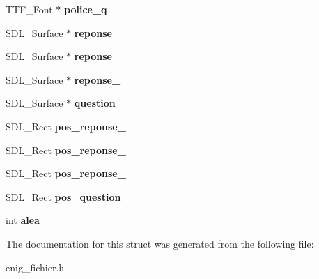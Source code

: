 \begin{DoxyCompactItemize}
\item 
T\+T\+F\+\_\+\+Font $\ast$ {\bfseries police\+\_\+q}\hypertarget{structenig__fichier_a02d52711f8a2ac96e3a5f943017a2ad4}{}\label{structenig__fichier_a02d52711f8a2ac96e3a5f943017a2ad4}

\item 
S\+D\+L\+\_\+\+Surface $\ast$ {\bfseries reponse\+\_}\hypertarget{structenig__fichier_a175bfff5134b24a3020d0dcd3f092a56}{}\label{structenig__fichier_a175bfff5134b24a3020d0dcd3f092a56}

\item 
S\+D\+L\+\_\+\+Surface $\ast$ {\bfseries reponse\+\_}\hypertarget{structenig__fichier_ad0a6c45ff0bdd032f0c300acd917ca25}{}\label{structenig__fichier_ad0a6c45ff0bdd032f0c300acd917ca25}

\item 
S\+D\+L\+\_\+\+Surface $\ast$ {\bfseries reponse\+\_}\hypertarget{structenig__fichier_afa09f852f3e2900e3b707341d82a221c}{}\label{structenig__fichier_afa09f852f3e2900e3b707341d82a221c}

\item 
S\+D\+L\+\_\+\+Surface $\ast$ {\bfseries question}\hypertarget{structenig__fichier_a4a5b9cc060528d5b8e91aab4bfe0c045}{}\label{structenig__fichier_a4a5b9cc060528d5b8e91aab4bfe0c045}

\item 
S\+D\+L\+\_\+\+Rect {\bfseries pos\+\_\+reponse\+\_}\hypertarget{structenig__fichier_a120aa667d779f2798aeabb95fb806a9c}{}\label{structenig__fichier_a120aa667d779f2798aeabb95fb806a9c}

\item 
S\+D\+L\+\_\+\+Rect {\bfseries pos\+\_\+reponse\+\_}\hypertarget{structenig__fichier_a6a6cda0d60b792872ae38af2e89d76c9}{}\label{structenig__fichier_a6a6cda0d60b792872ae38af2e89d76c9}

\item 
S\+D\+L\+\_\+\+Rect {\bfseries pos\+\_\+reponse\+\_}\hypertarget{structenig__fichier_a5efb104050d02226d82566373e92b50e}{}\label{structenig__fichier_a5efb104050d02226d82566373e92b50e}

\item 
S\+D\+L\+\_\+\+Rect {\bfseries pos\+\_\+question}\hypertarget{structenig__fichier_a119b85b096d29f8e4f684f1ac9272e47}{}\label{structenig__fichier_a119b85b096d29f8e4f684f1ac9272e47}

\item 
int {\bfseries alea}\hypertarget{structenig__fichier_ad449a07b3a21c75823db71aa06c92f55}{}\label{structenig__fichier_ad449a07b3a21c75823db71aa06c92f55}

\end{DoxyCompactItemize}


The documentation for this struct was generated from the following file\+:\begin{DoxyCompactItemize}
\item 
enig\+\_\+fichier.\+h\end{DoxyCompactItemize}

